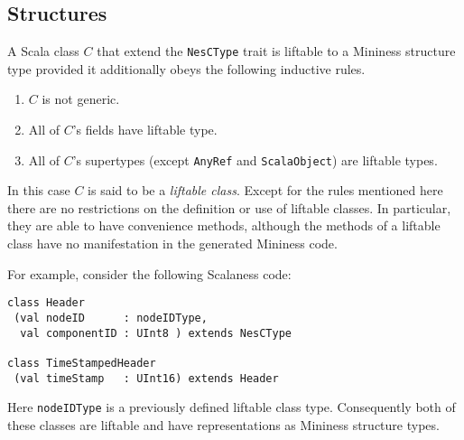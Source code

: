 \subsection{Structures}

A Scala class $C$ that extend the \texttt{NesCType} trait is liftable to a Mininess structure
type provided it additionally obeys the following inductive rules.

\begin{enumerate}
\item $C$ is not generic.
\item All of $C$'s fields have liftable type.
\item All of $C$'s supertypes (except \texttt{AnyRef} and \texttt{ScalaObject}) are liftable
  types.
\end{enumerate}

In this case $C$ is said to be a \textit{liftable class}. Except for the rules mentioned here
there are no restrictions on the definition or use of liftable classes. In particular, they are
able to have convenience methods, although the methods of a liftable class have no manifestation
in the generated Mininess code.

For example, consider the following Scalaness code:

\singlespace
\begin{lstlisting}[language=scalaness]
class Header
 (val nodeID      : nodeIDType,
  val componentID : UInt8 ) extends NesCType

class TimeStampedHeader
 (val timeStamp   : UInt16) extends Header
\end{lstlisting}
\primaryspacing

Here \texttt{nodeIDType} is a previously defined liftable class type. Consequently both of these
classes are liftable and have representations as Mininess structure types. 

